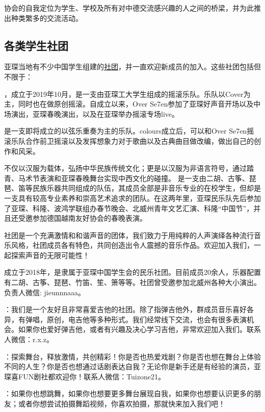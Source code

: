     协会的自我定位为学生、学校及所有对中德交流感兴趣的人之间的桥梁，并为此推出种类繁多的交流活动。

  \subsection{各类学生社团}\label{subsec:各类学生社团}

    亚琛当地有不少中国学生组建的\href{http://www.vcwsa.rwth-aachen.de/category/lives/社团风采/}{社团}，并一直欢迎新成员的加入。这些社团包括但不限于：

    ，成立于2019年10月，是一支由亚琛工大学生组成的摇滚乐队。乐队以Cover为主，同时也在做原创摇滚。自成立以来，Over Se7en参加了亚琛好声音开场以及中场演出，亚琛春晚演出，以及在亚琛举办摇滚专场live。

    是一支即将成立的以弦乐重奏为主的乐队。colours成立后，可以和Over Se7en摇滚乐队合作前卫摇滚以及发挥想象力对于歌曲以及古典曲目做改编，做出自己的创作和风采。

    不仅以汉服为载体，弘扬中华民族传统文化；更是以汉服为非语言符号，通过踏青、马术节表演和亚琛春晚舞台实现中西文化的碰撞。
    是一支由二胡、古筝、琵琶、笛等民族乐器共同组成的队伍，其成员全部是非音乐专业的在校学生，但却是一支具有较高专业素养和崇高艺术追求的团队。在这两年里，亚琛民乐队先后参加了亚琛、科隆、波鸿学联组办春节晚会、北威州青年文艺汇演、科隆``中国节''，并且还受邀参加德国越南友好协会的春晚表演。

    社团是一个充满激情和和谐声音的团体，我们致力于用纯粹的人声演绎各种流行音乐风格，社团成员各有特色，共同创造出令人震撼的音乐作品。欢迎加入我们，一起探索声音的无限可能性！

    成立于2018年，是隶属于亚琛中国学生会的民乐社团。目前成员20余人，乐器配置有二胡、古筝、琵琶、竹笛、笙、箫等等。社团曾受邀参加北威州各种大小演出。负责人微信: jieunnnaaa。

    ：我们是一个友好且非常喜爱吉他的社团。除了指弹吉他外，群成员音乐喜好各异，有弹唱，原创，电吉他等多种形式。我们经常线下交流，也会有很多表演机会。如果你也爱好弹吉他，或者有兴趣及决心学习吉他，非常欢迎加入我们。联系人微信：r.x.z。

    ：探索舞台，释放激情，共创精彩！你是否也热爱戏剧？你是否也想在舞台上体验不同的人生？你是否也想通过话剧表达自我？无论你是新手还是有经验的演员，亚琛喜FUN剧社都欢迎你！联系人微信：Tuizone21。

    ：如果你也想跳舞，如果你也想要更多舞台展现自我，如果你也想要认识更多的朋友；或者你想尝试拍摄舞蹈视频，你喜欢拍摄，那就快来加入我们吧！

